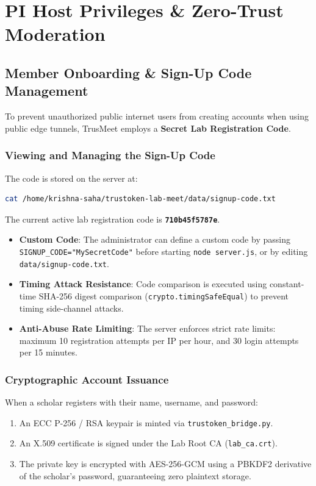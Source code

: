 \documentclass[11pt,a4paper]{report}
\begin{document}
\newpage
\chapter{PI Host Privileges \& Zero-Trust Moderation}

\section{Member Onboarding \& Sign-Up Code Management}
To prevent unauthorized public internet users from creating accounts when using public edge tunnels, TrusMeet employs a \textbf{Secret Lab Registration Code}.

\subsection{Viewing and Managing the Sign-Up Code}
The code is stored on the server at:
\begin{lstlisting}[language=bash]
cat /home/krishna-saha/trustoken-lab-meet/data/signup-code.txt
\end{lstlisting}
The current active lab registration code is \texttt{\textbf{710b45f5787e}}.
\begin{itemize}
    \item \textbf{Custom Code}: The administrator can define a custom code by passing \texttt{SIGNUP\_CODE="MySecretCode"} before starting \texttt{node server.js}, or by editing \texttt{data/signup-code.txt}.
    \item \textbf{Timing Attack Resistance}: Code comparison is executed using constant-time SHA-256 digest comparison (\texttt{crypto.timingSafeEqual}) to prevent timing side-channel attacks.
    \item \textbf{Anti-Abuse Rate Limiting}: The server enforces strict rate limits: maximum 10 registration attempts per IP per hour, and 30 login attempts per 15 minutes.
\end{itemize}

\subsection{Cryptographic Account Issuance}
When a scholar registers with their name, username, and password:
\begin{enumerate}[noitemsep]
    \item An ECC P-256 / RSA keypair is minted via \texttt{trustoken\_bridge.py}.
    \item An X.509 certificate is signed under the Lab Root CA (\texttt{lab\_ca.crt}).
    \item The private key is encrypted with AES-256-GCM using a PBKDF2 derivative of the scholar's password, guaranteeing zero plaintext storage.
\end{enumerate}
\end{document}
